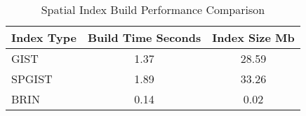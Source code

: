 \begin{table}
\caption{Spatial Index Build Performance Comparison}
\label{tab:spatial_index_build}
\begin{tabular}{lcc}
\toprule
Index Type & Build Time Seconds & Index Size Mb \\
\midrule
GIST & 1.37 & 28.59 \\
SPGIST & 1.89 & 33.26 \\
BRIN & 0.14 & 0.02 \\
\bottomrule
\end{tabular}
\end{table}
